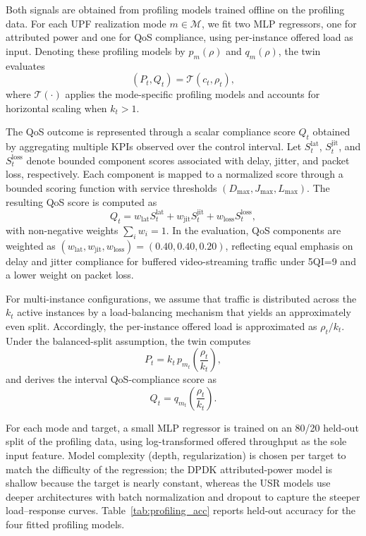 \documentclass[a4paper,fleqn]{cas-sc}
\begin{document}
Both signals are obtained from profiling models trained offline on the profiling data. For each UPF realization mode $m\in\mathcal{M}$, we fit two MLP regressors, one for attributed power and one for QoS compliance, using per-instance offered load as input. Denoting these profiling models by $p_m(\rho)$ and $q_m(\rho)$, the twin evaluates
\begin{equation}
(P_t,Q_t)=\mathcal{T}(c_t,\rho_t),
\end{equation}
where $\mathcal{T}(\cdot)$ applies the mode-specific profiling models and accounts for horizontal scaling when $k_t>1$.

The QoS outcome is represented through a scalar compliance score $Q_t$ obtained by aggregating multiple KPIs observed over the control interval. Let $S^{\mathrm{lat}}_t$, $S^{\mathrm{jit}}_t$, and $S^{\mathrm{loss}}_t$ denote bounded component scores associated with delay, jitter, and packet loss, respectively. Each component is mapped to a normalized score through a bounded scoring function with service thresholds $(D_{\max},J_{\max},L_{\max})$. The resulting QoS score is computed as
\begin{equation}
Q_t = w_{\mathrm{lat}} S^{\mathrm{lat}}_t + w_{\mathrm{jit}} S^{\mathrm{jit}}_t + w_{\mathrm{loss}} S^{\mathrm{loss}}_t,
\label{eq:qos_weighted}
\end{equation}
with non-negative weights $\sum_i w_i = 1$. In the evaluation, QoS components are weighted as $(w_{\mathrm{lat}}, w_{\mathrm{jit}}, w_{\mathrm{loss}}) = (0.40, 0.40, 0.20)$, reflecting equal emphasis on delay and jitter compliance for buffered video-streaming traffic under 5QI=9 and a lower weight on packet loss.

For multi-instance configurations, we assume that traffic is distributed across the $k_t$ active instances by a load-balancing mechanism that yields an approximately even split. Accordingly, the per-instance offered load is approximated as $\rho_t/k_t$. Under the balanced-split assumption, the twin computes
\begin{equation}
P_t = k_t\, p_{m_t}\!\left(\frac{\rho_t}{k_t}\right),
\label{eq:power_aggregate}
\end{equation}
and derives the interval QoS-compliance score as
\begin{equation}
Q_t = q_{m_t}\!\left(\frac{\rho_t}{k_t}\right).
\label{eq:qos_aggregate}
\end{equation}

For each mode and target, a small MLP regressor is trained on an 80/20 held-out split of the profiling data, using log-transformed offered throughput as the sole input feature. Model complexity (depth, regularization) is chosen per target to match the difficulty of the regression; the DPDK attributed-power model is shallow because the target is nearly constant, whereas the USR models use deeper architectures with batch normalization and dropout to capture the steeper load--response curves. Table~\ref{tab:profiling_acc} reports held-out accuracy for the four fitted profiling models.
\end{document}

